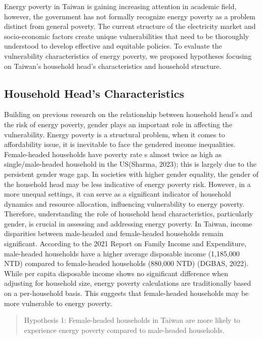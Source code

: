 \documentclass[
  twoside,
  openright,
  degree    = master,               %
  language  = english,              %
  fontset   = overleaf,             %
  watermark = true,                 %
  doi       = true,                 %
]{ntuthesis}
\begin{document}
Energy poverty in Taiwan is gaining increasing attention in academic
field, however, the government has not formally recognize energy poverty
as a problem distinct from general poverty. The current structure of the
electricity market and socio-economic factors create unique
vulnerabilities that need to be thoroughly understood to develop
effective and equitable policies. To evaluate the vulnerability
characteristics of energy poverty, we proposed hypotheses focusing on
Taiwan's household head's characteristics and household structure.

\hypertarget{household-heads-characteristics}{%
\subsection{Household Head's
Characteristics}\label{household-heads-characteristics}}

Building on previous research on the relationship between household
head's and the risk of energy poverty, gender plays an important role in
affecting the vulnerability. Energy poverty is a structural problem,
when it comes to affordability issue, it is inevitable to face the
gendered income inequalities. Female-headed households have poverty rate
s almost twice as high as single/male-headed household in the US(Sharma,
2023); this is largely due to the persistent gender wage gap. In
societies with higher gender equality, the gender of the household head
may be less indicative of energy poverty risk. However, in a more
unequal settings, it can serve as a significant indicator of household
dynamics and resource allocation, influencing vulnerability to energy
poverty. Therefore, understanding the role of household head
characteristics, particularly gender, is crucial in assessing and
addressing energy poverty. In Taiwan, income disparities between
male-headed and female-headed households remain significant. According
to the 2021 Report on Family Income and Expenditure, male-headed
households have a higher average disposable income (1,185,000 NTD)
compared to female-headed households (880,000 NTD) (DGBAS, 2022). While
per capita disposable income shows no significant difference when
adjusting for household size, energy poverty calculations are
traditionally based on a per-household basis. This suggests that
female-headed households may be more vulnerable to energy poverty.

\begin{quote}
Hypothesis 1: Female-headed households in Taiwan are more likely to
experience energy poverty compared to male-headed households.
\end{quote}
\end{document}
